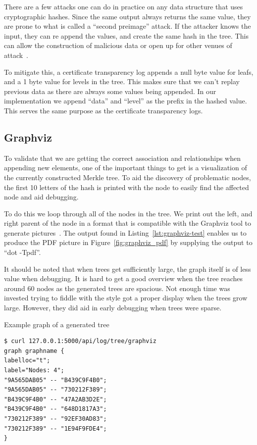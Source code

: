 \documentclass[../Main/thesis.tex]{subfiles}
\begin{document}
There are a few attacks one can do in practice on any data structure that uses
cryptographic hashes. Since the same output always returns the same value, they
are prone to what is called a ``second preimage'' attack. If the
attacker knows the input, they can re append the values, and create the same hash
in the tree.  This can allow the construction of malicious data or open up for
other venues of attack~\cite{rfc4270}.

To mitigate this, a certificate transparency log appends a null byte value for
leafs, and a 1 byte value for levels in the tree. This makes sure that we can't
replay previous data as there are always some values being appended. In our
implementation we append ``data'' and ``level'' as the prefix in the hashed
value. This serves the same purpose as the certificate transparency logs.


\subsection*{Graphviz}%
\label{sub:graph_merkle_tree}
To validate that we are getting the correct association and relationships when
appending new elements, one of the important things to get is a visualization of
the currently constructed Merkle tree. To aid the discovery of problematic
nodes, the first 10 letters of the hash is printed with the node to easily find
the affected node and aid debugging.

To do this we loop through all of the nodes in the tree. We print out the left,
and right parent of the node in a format that is compatible with the Graphviz
tool to generate pictures~\cite{Ellson01graphviz}. The output found in
Listing~\ref{lst:graphviz-test} enables us to produce the PDF picture in
Figure~\ref{fig:graphviz_pdf} by supplying the output to ``dot -Tpdf''.

It should be noted that when trees get sufficiently large, the graph itself is
of less value when debugging. It is hard to get a good overview when the tree
reaches around 60 nodes as the generated trees are spacious. Not enough time was
invested trying to fiddle with the style got a proper display when the trees
grow large. However, they did aid in early debugging when trees were sparse.

\begin{listing}[H]
\caption{Example graph of a generated tree}
\label{lst:graphviz-test}
\begin{verbatim}
$ curl 127.0.0.1:5000/api/log/tree/graphviz                        
graph graphname {
labelloc="t";
label="Nodes: 4";
"9A565DAB05" -- "B439C9F4B0";
"9A565DAB05" -- "730212F389";
"B439C9F4B0" -- "47A2AB3D2E";
"B439C9F4B0" -- "648D1817A3";
"730212F389" -- "92EF30AD83";
"730212F389" -- "1E94F9FDE4";
}
\end{verbatim}
\end{listing}
\end{document}
